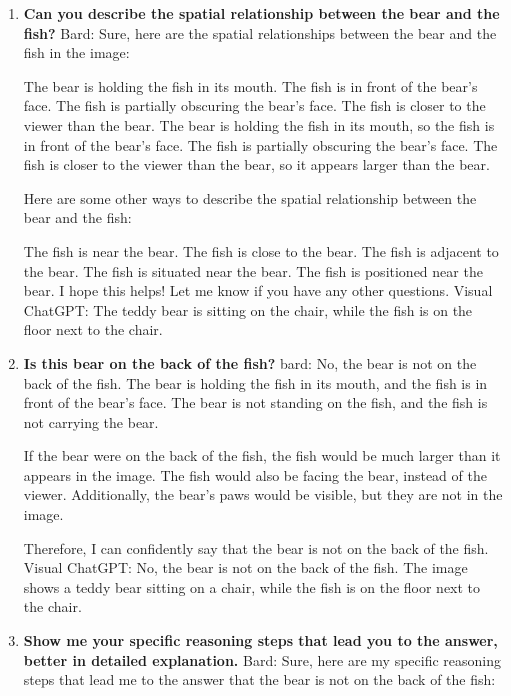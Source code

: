    \begin{enumerate}
        \item \textbf{Can you describe the spatial relationship between the bear and the fish?}
        \subitem Bard:
        Sure, here are the spatial relationships between the bear and the fish in the image:

        The bear is holding the fish in its mouth.
        The fish is in front of the bear's face.
        The fish is partially obscuring the bear's face.
        The fish is closer to the viewer than the bear.
        The bear is holding the fish in its mouth, so the fish is in front of the bear's face. The fish is partially obscuring the bear's face. The fish is closer to the viewer than the bear, so it appears larger than the bear.

        Here are some other ways to describe the spatial relationship between the bear and the fish:

        The fish is near the bear.
        The fish is close to the bear.
        The fish is adjacent to the bear.
        The fish is situated near the bear.
        The fish is positioned near the bear.
        I hope this helps! Let me know if you have any other questions.
        \subitem Visual ChatGPT: The teddy bear is sitting on the chair, while the fish is on the floor next to the chair.
        \item \textbf{Is this bear on the back of the fish?}
        \subitem bard:
        No, the bear is not on the back of the fish. The bear is holding the fish in its mouth, and the fish is in front of the bear's face. The bear is not standing on the fish, and the fish is not carrying the bear.
        
        If the bear were on the back of the fish, the fish would be much larger than it appears in the image. The fish would also be facing the bear, instead of the viewer. Additionally, the bear's paws would be visible, but they are not in the image.
        
        Therefore, I can confidently say that the bear is not on the back of the fish.
        \subitem Visual ChatGPT: No, the bear is not on the back of the fish. The image shows a teddy bear sitting on a chair, while the fish is on the floor next to the chair.
        \item \textbf{Show me your specific reasoning steps that lead you to the answer, better in detailed explanation.}
        \subitem Bard:
        Sure, here are my specific reasoning steps that lead me to the answer that the bear is not on the back of the fish:
        

\end{enumerate}
